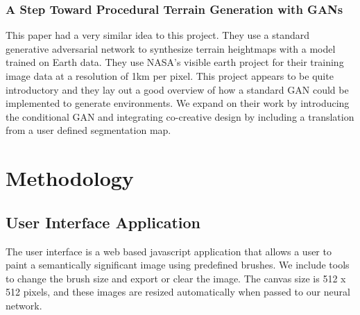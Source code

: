 \documentclass[twocolumn]{article}
\begin{document}
	
	\subsubsection{A Step Toward Procedural Terrain Generation with GANs}
	
	This paper had a very similar idea to this project. They use a standard generative adversarial network to synthesize terrain heightmaps with a model trained on Earth data. They use NASA's visible earth project for their training image data at a resolution of 1km per pixel. This project appears to be quite introductory and they lay out a good overview of how a standard GAN could be implemented to generate environments. We expand on their work by introducing the conditional GAN and integrating co-creative design by including a translation from a user defined segmentation map. \cite{beckham2017step}
		
	\section{Methodology}
		
	\subsection{User Interface Application}
	
	The user interface is a web based javascript application that allows a user to paint a semantically significant image using predefined brushes. We include tools to change the brush size and export or clear the image. The canvas size is 512 x 512 pixels, and these images are resized automatically when passed to our neural network.
\end{document}
